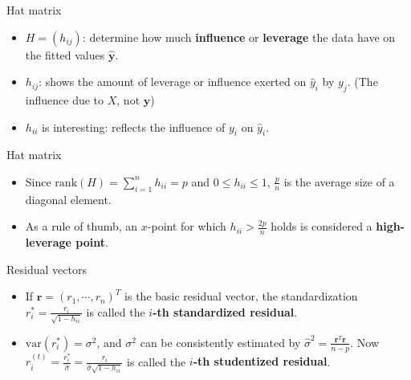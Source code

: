 \documentclass{beamer}
\begin{document}
\begin{frame}{Hat matrix}
\begin{itemize}
\item
$H=(h_{ij})$: determine how much \textbf{influence} or \textbf{leverage} the data have on the 
fitted values $\hat{\textbf{y}}$.
\item
$h_{ij}$:  shows the amount of leverage or influence exerted on $\hat{y}_i$ by $y_j$.
(The influence due to $X$,  not $\textbf{y}$) 
\item
$h_{ii}$ is interesting: reflects the influence of $y_i$ on $\hat{y}_i$. 
\end{itemize}
\end{frame}

\begin{frame}{Hat matrix}
\begin{itemize}

\item
Since $\displaystyle \mbox{rank}(H)=\sum_{i=1}^n h_{ii}=p$ and $0\leq h_{ii}\leq 1$, 
$\displaystyle \frac{p}{n}$ is the average size of a diagonal element.
\item
As a rule of thumb, an $x$-point for which $h_{ii}>\frac{2p}{n}$ holds is considered a \textbf{high-leverage
point}. 


\end{itemize}

\end{frame}

\begin{frame}{Residual vectors}
\begin{itemize}
\item
If $\textbf{r}=(r_1,\cdots, r_n)^T$ is the basic residual vector, the standardization 
$\displaystyle r_i^*=\frac{r_i}{\sqrt{1-h_{ii}}}$ is called the \textbf{$i$-th standardized residual}.
\item
$\mbox{var}(r_i^*)=\sigma^2$, and $\sigma^2$ can be consistently estimated by $\displaystyle \hat{\sigma}^2=\frac{\textbf{r}^T
\textbf{r}}{n-p}$. Now $\displaystyle r_i^{(t)}=\frac{r_i^*}{\hat{\sigma}}=\frac{r_i}{\hat{\sigma}\sqrt{1-h_{ii}}}$
is called the \textbf{$i$-th studentized residual}.
\end{itemize}
\end{frame}
\end{document}
